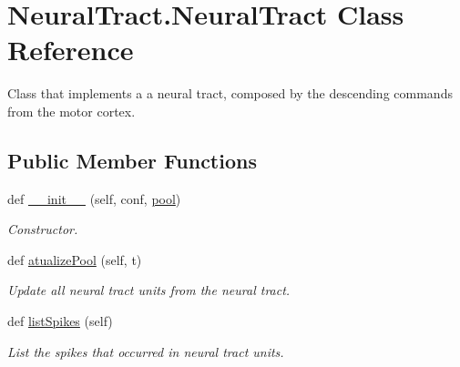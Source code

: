 \hypertarget{class_neural_tract_1_1_neural_tract}{}\section{Neural\+Tract.\+Neural\+Tract Class Reference}
\label{class_neural_tract_1_1_neural_tract}


Class that implements a a neural tract, composed by the descending commands from the motor cortex.  


\subsection*{Public Member Functions}
\begin{DoxyCompactItemize}
\item 
def \hyperlink{class_neural_tract_1_1_neural_tract_a06e60f2f98f39f21c542c108245cb937}{\+\_\+\+\_\+init\+\_\+\+\_\+} (self, conf, \hyperlink{class_neural_tract_1_1_neural_tract_af0d232b9b86f3bae802b32777d0405d0}{pool})
\begin{DoxyCompactList}\small\item\em Constructor. \end{DoxyCompactList}\item 
def \hyperlink{class_neural_tract_1_1_neural_tract_acae726b486d80f6a60c6c2ddabadb5a7}{atualize\+Pool} (self, t)
\begin{DoxyCompactList}\small\item\em Update all neural tract units from the neural tract. \end{DoxyCompactList}\item 
def \hyperlink{class_neural_tract_1_1_neural_tract_ad0119f85114d9da23e17c90ef9638da7}{list\+Spikes} (self)
\begin{DoxyCompactList}\small\item\em List the spikes that occurred in neural tract units. \end{DoxyCompactList}\end{DoxyCompactItemize}
